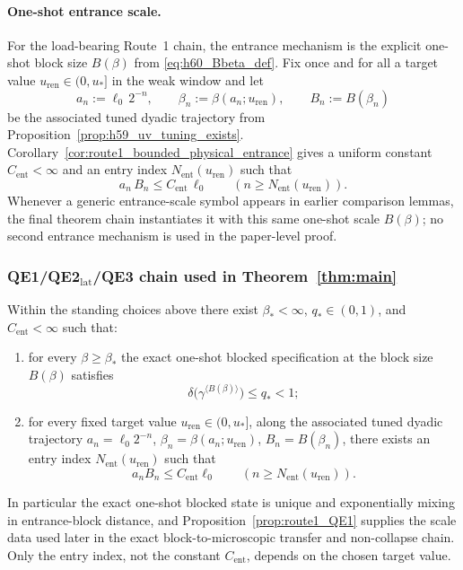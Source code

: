 \paragraph{One-shot entrance scale.}
For the load-bearing Route~1 chain, the entrance mechanism is the explicit one-shot block size $B(\beta)$ from \eqref{eq:h60_Bbeta_def}.
Fix once and for all a target value $u_{\mathrm{ren}}\in(0,u_\ast]$ in the weak window and let
\[
a_n:=\ell_0\,2^{-n},\qquad \beta_n:=\beta(a_n;u_{\mathrm{ren}}),\qquad B_n:=B(\beta_n)
\]
be the associated tuned dyadic trajectory from Proposition~\ref{prop:h59_uv_tuning_exists}.
Corollary~\ref{cor:route1_bounded_physical_entrance} gives a uniform constant $C_{\mathrm{ent}}<\infty$ and an entry index $N_{\mathrm{ent}}(u_{\mathrm{ren}})$ such that
\begin{equation}
 a_n\,B_n\le C_{\mathrm{ent}}\,\ell_0\qquad(n\ge N_{\mathrm{ent}}(u_{\mathrm{ren}})).
 \label{eq:bounded_phys_entrance_main}
\end{equation}
Whenever a generic entrance-scale symbol appears in earlier comparison lemmas, the final theorem chain instantiates it with this same one-shot scale $B(\beta)$; no second entrance mechanism is used in the paper-level proof.

\subsubsection{QE1/QE2$_{\mathrm{lat}}$/QE3 chain used in Theorem~\ref{thm:main}}

\begin{proposition}\label{prop:route1_QE1}
Within the standing choices above there exist $\beta_\ast<\infty$, $q_\ast\in(0,1)$, and $C_{\mathrm{ent}}<\infty$ such that:
\begin{enumerate}[label=\textup{(\roman*)},leftmargin=2.5em]
\item for every $\beta\ge \beta_\ast$ the exact one-shot blocked specification at the block size $B(\beta)$ satisfies
\begin{equation}
\delta\!\bigl(\gamma^{\langle B(\beta)\rangle}\bigr)\le q_\ast<1;
\label{eq:bounded_phys_entrance_main_repack_a}
\end{equation}
\item for every fixed target value $u_{\mathrm{ren}}\in(0,u_\ast]$, along the associated tuned dyadic trajectory $a_n=\ell_0 2^{-n}$, $\beta_n=\beta(a_n;u_{\mathrm{ren}})$, $B_n=B(\beta_n)$, there exists an entry index $N_{\mathrm{ent}}(u_{\mathrm{ren}})$ such that
\begin{equation}
 a_n B_n\le C_{\mathrm{ent}}\ell_0
 \qquad (n\ge N_{\mathrm{ent}}(u_{\mathrm{ren}})).
 \label{eq:bounded_phys_entrance_main_repack}
\end{equation}
\end{enumerate}
In particular the exact one-shot blocked state is unique and exponentially mixing in entrance-block distance, and Proposition~\ref{prop:route1_QE1} supplies the scale data used later in the exact block-to-microscopic transfer and non-collapse chain. Only the entry index, not the constant $C_{\mathrm{ent}}$, depends on the chosen target value.
\end{proposition}

